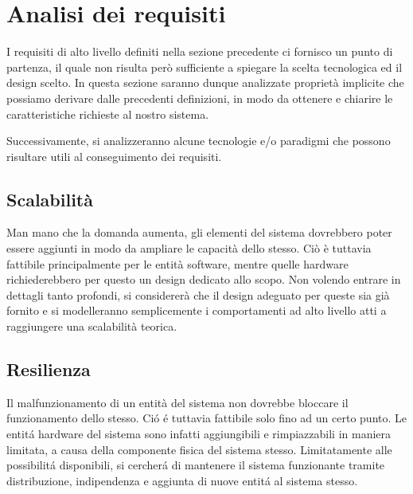 \section{Analisi dei requisiti}

I requisiti di alto livello definiti nella sezione precedente ci fornisco un punto di partenza, il quale non risulta però sufficiente a spiegare la scelta tecnologica ed il design scelto. In questa sezione saranno dunque analizzate proprietà implicite che possiamo derivare dalle precedenti definizioni, in modo da ottenere e chiarire le caratteristiche richieste al nostro sistema.

\parag
Successivamente, si analizzeranno alcune tecnologie e/o paradigmi che possono risultare utili al conseguimento dei requisiti.

\subsection{Scalabilità}
Man mano che la domanda aumenta, gli elementi del sistema dovrebbero poter essere aggiunti in modo da ampliare le capacità dello stesso. Ciò è tuttavia fattibile principalmente per le entità software, mentre quelle hardware richiederebbero per questo un design dedicato allo scopo. Non volendo entrare in dettagli tanto profondi, si considererà che il design adeguato per queste sia già fornito e si modelleranno semplicemente i comportamenti ad alto livello atti a raggiungere una scalabilità teorica.

\subsection{Resilienza}
Il malfunzionamento di un entità del sistema non dovrebbe bloccare il funzionamento dello stesso. Ci\'o \'e tuttavia fattibile solo fino ad un certo punto. Le entit\'a hardware del sistema sono infatti aggiungibili e rimpiazzabili in maniera limitata, a causa della componente fisica del sistema stesso. Limitatamente alle possibilit\'a disponibili, si cercher\'a di mantenere il sistema funzionante tramite distribuzione, indipendenza e aggiunta di nuove entit\'a al sistema stesso.

